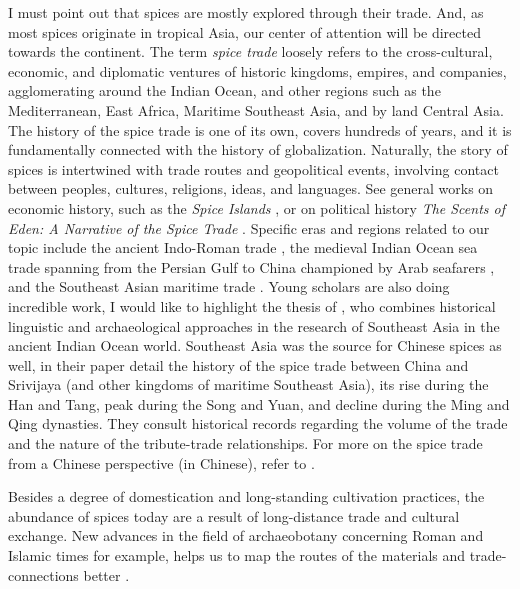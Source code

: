 I must point out that spices are mostly explored through their trade. And, as most spices originate in tropical Asia, our center of attention will be directed towards the continent. The term \textit{spice trade} loosely refers to the cross-cultural, economic, and diplomatic ventures of historic kingdoms, empires, and companies, agglomerating around the Indian Ocean, and other regions such as the Mediterranean, East Africa, Maritime Southeast Asia, and by land Central Asia. The history of the spice trade is one of its own, covers hundreds of years, and it is fundamentally connected with the history of globalization. Naturally, the story of spices is intertwined with trade routes and geopolitical events, involving contact between peoples, cultures, religions, ideas, and languages. See general works on economic history, such as the \textit{Spice Islands} \autocite{burnet_spice_2011}, or on political history \textit{The Scents of Eden: A Narrative of the Spice Trade} \autocite{corn_scents_1998}. Specific eras and regions related to our topic include the ancient Indo-Roman trade \autocite{sidebotham_berenike_2011,cobb_indian_2019}, the medieval Indian Ocean sea trade spanning from the Persian Gulf to China championed by Arab seafarers \autocite{hourani_arab_1975, pearson_spices_1996}, and the Southeast Asian maritime trade \autocite{donkin_between_2003,hall_history_2010,reid_southeast_1988,chen_toward_2019}. Young scholars are also doing incredible work, I would like to highlight the thesis of \textcite{hoogervorst_southeast_2012}, who combines historical linguistic and archaeological approaches in the research of Southeast Asia in the ancient Indian Ocean world. Southeast Asia was the source for Chinese spices as well, in their paper \textcite{xu__2021} detail the history of the spice trade between China and Srivijaya (and other kingdoms of maritime Southeast Asia), its rise during the Han and Tang, peak during the Song and Yuan, and decline during the Ming and Qing dynasties. They consult historical records regarding the volume of the trade and the nature of the tribute-trade relationships. For more on the spice trade from a Chinese perspective (in Chinese), refer to \textcite{yan__2007,yan__2012,yan_1619_2016}.

Besides a degree of domestication and long-standing cultivation practices, the abundance of spices today are a result of long-distance trade and cultural exchange. New advances in the field of archaeobotany concerning Roman and Islamic times for example, helps us to map the routes of the materials and trade-connections better \autocites[see][]{van_der_veen_roman_2015}{ van_der_veen_archaeobotany_2018}.

